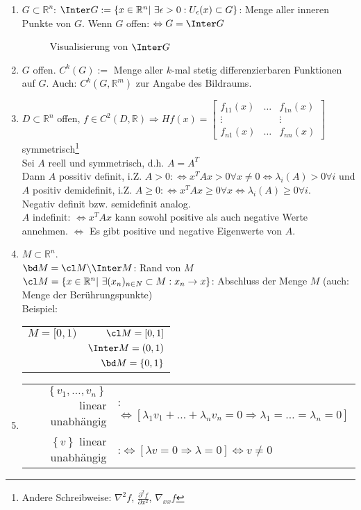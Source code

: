 \begin{enumerate}[label=\arabic*)]
  \item $G\subset\mathbb{R}^n$: $\Inter G:=\left\{x\in\mathbb{R}^n|\ \exists\epsilon>0:U_{\epsilon}(x)\subset G \right\}$: Menge aller inneren Punkte von $G$. Wenn $G$ offen:
  $\Leftrightarrow G=\Inter G$
 	\begin{figure}[htb]
	\centering
		
		\caption{Visualisierung von $\Inter G$}
		\label{fig:kap_1_inter_g}
	\end{figure}
  \item $G$ offen. $C^k(G):=$ Menge aller $k$-mal stetig differenzierbaren Funktionen auf $G$. Auch: $C^k(G,\mathbb{R}^m)$ zur Angabe des Bildraums.
  \item $D\subset\mathbb{R}^n$ offen, $f\in C^2(D,\mathbb{R})\Rightarrow H f(x)=\begin{bmatrix}
  f_{11}(x) & \ldots & f_{1n}(x) \\
  \vdots 	&		 & \vdots\\
  f_{n1}(x) & \ldots & f_{nn}(x)
  \end{bmatrix}$ symmetrisch\footnote{Andere Schreibweise: $\nabla^2 f$, $\frac{\partial^2 f}{\partial x^2}$, $\nabla_{xx}f$}\\
  Sei $A$ reell und symmetrisch, d.h. $A=A^T$\\
  Dann $A$ possitiv definit, i.Z. $A>0:\Leftrightarrow x^TAx>0\forall x\neq 0\Leftrightarrow \lambda_i(A)>0\forall i$ und $A$ positiv demidefinit, i.Z. $A\ge 0:\Leftrightarrow x^TAx\ge
  0\forall x\Leftrightarrow \lambda_i(A)\ge 0\forall i$.\\
  Negativ definit bzw. semidefinit analog.\\
  $A$ indefinit: $\Leftrightarrow x^TAx$ kann sowohl positive als auch negative Werte annehmen. $\Leftrightarrow$ Es gibt positive und negative Eigenwerte von $A$.
  \item $M\subset \mathbb{R}^n$.\\
		$\bd M = \cl M\backslash\Inter M$: Rand von $M$\\
		$\cl M =\left\{x\in\mathbb{R}^n|\ \exists(x_n)_{n\in N}\subset M:x_n\rightarrow x \right\}$: Abschluss der Menge $M$ (auch: Menge der Berührungspunkte)\\
		Beispiel: \begin{tabular}[t]{lr}
			$M=[0,1)$ & $\cl M=[0,1]$\\
					  & $\Inter M = (0,1)$\\
					  & $\bd M =\{0,1\}$
		\end{tabular}
  \item \begin{tabular}[t]{rl}
  $\left\{v_1,\ldots,v_n \right\}$ linear unabhängig &:$\Leftrightarrow [\lambda_1 v_1+\ldots+\lambda_n v_n=0\Rightarrow \lambda_1=\ldots=\lambda_n=0]$\\
  $\left\{v \right\}$ linear unabhängig &:$\Leftrightarrow [\lambda v=0\Rightarrow \lambda = 0]\Leftrightarrow v\neq 0$
  \end{tabular}
\end{enumerate}
